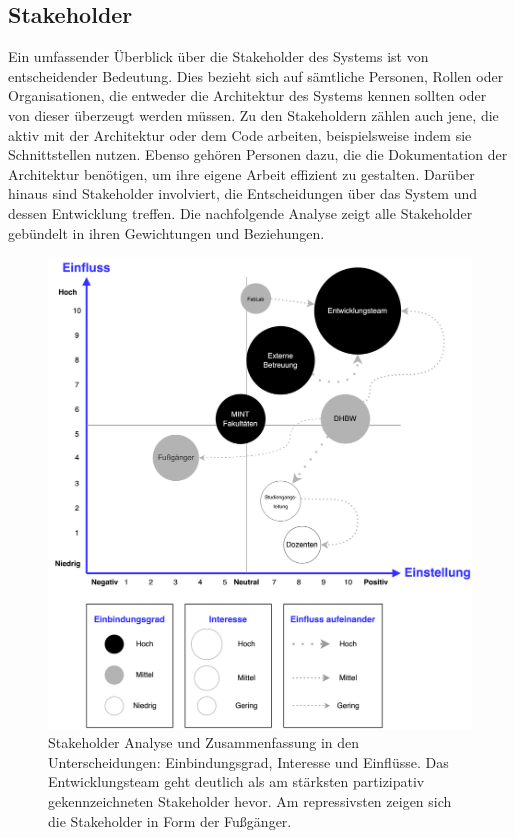 \documentclass[
]{article}
\begin{document}
\newpage
\hypertarget{_stakeholder}{%
\subsection{Stakeholder}\label{_stakeholder}}
Ein umfassender Überblick über die Stakeholder des Systems ist von entscheidender Bedeutung. Dies bezieht sich auf sämtliche Personen, Rollen oder Organisationen, die entweder die Architektur des Systems kennen sollten oder von dieser überzeugt werden müssen. Zu den Stakeholdern zählen auch jene, die aktiv mit der Architektur oder dem Code arbeiten, beispielsweise indem sie Schnittstellen nutzen. Ebenso gehören Personen dazu, die die Dokumentation der Architektur benötigen, um ihre eigene Arbeit effizient zu gestalten. Darüber hinaus sind Stakeholder involviert, die Entscheidungen über das System und dessen Entwicklung treffen.
Die nachfolgende Analyse zeigt alle Stakeholder gebündelt in ihren Gewichtungen und Beziehungen.  
\begin{figure}[H]
  \centering
  \includegraphics[width=160mm]{./resources/stakeholderanalyse.drawio.png}
  \caption{Stakeholder Analyse und Zusammenfassung in den Unterscheidungen: Einbindungsgrad, Interesse und Einflüsse. Das Entwicklungsteam geht deutlich als am stärksten partizipativ gekennzeichneten Stakeholder hevor. Am repressivsten zeigen sich die Stakeholder in Form der Fußgänger.}
  \label{fig:deine_label}
\end{figure}
\end{document}
